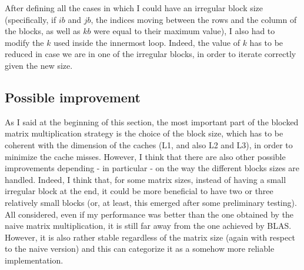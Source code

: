 \documentclass[unicode,11pt,a4paper,oneside,numbers=endperiod,openany]{scrartcl}
\begin{document}
After defining all the cases in which I could have an irregular block size (specifically, if $ib$ and $jb$, the indices moving between the rows and the column of the blocks, as well as $kb$ were equal to their maximum value), I also had to modify the $k$ used inside the innermost loop. Indeed, the value of $k$ has to be reduced in case we are in one of the irregular blocks, in order to iterate correctly given the new size. 

\subsection{Possible improvement}
As I said at the beginning of this section, the most important part of the blocked matrix multiplication strategy is the choice of the block size, which has to be coherent with the dimension of the caches (L1, and also L2 and L3), in order to minimize the cache misses. However, I think that there are also other possible improvements depending - in particular - on the way the different blocks sizes are handled. Indeed, I think that, for some matrix sizes, instead of having a small irregular block at the end, it could be more beneficial to have two or three relatively small blocks (or, at least, this emerged after some preliminary testing). All considered, even if my performance was better than the one obtained by the naive matrix multiplication, it is still far away from the one achieved by BLAS. However, it is also rather stable regardless of the matrix size (again with respect to the naive version) and this can categorize it as a somehow more reliable implementation.
\end{document}

